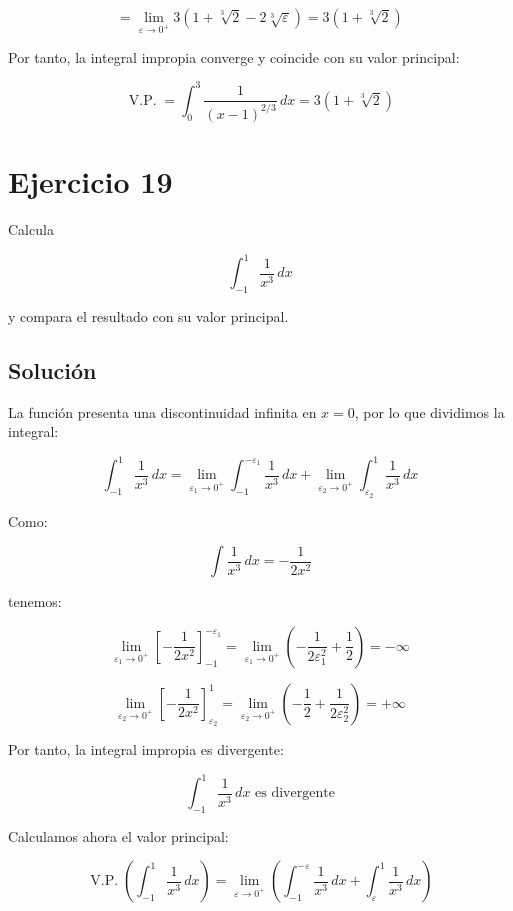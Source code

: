 \documentclass[fleqn]{article}
\begin{document}
	\[
	=
	\lim_{\varepsilon\to0^+}
	3\left(
	1+\sqrt[3]{2}-2\sqrt[3]{\varepsilon}
	\right)
	=
	3\left(1+\sqrt[3]{2}\right)
	\]

	Por tanto, la integral impropia converge y coincide con su valor principal:

	\[
	\boxed{
	\operatorname{V.P.}
	=
	\int_0^3\frac{1}{(x-1)^{2/3}}\,dx
	=
	3\left(1+\sqrt[3]{2}\right)
	}
	\]

\section{Ejercicio 19}
	Calcula

	\[
	\int_{-1}^{1}\frac{1}{x^3}\,dx
	\]

	y compara el resultado con su valor principal.

	\subsection{Solución}

	La función presenta una discontinuidad infinita en $x=0$, por lo que dividimos la integral:

	\[
	\int_{-1}^{1}\frac{1}{x^3}\,dx
	=
	\lim_{\varepsilon_1\to0^+}
	\int_{-1}^{-\varepsilon_1}\frac{1}{x^3}\,dx
	+
	\lim_{\varepsilon_2\to0^+}
	\int_{\varepsilon_2}^{1}\frac{1}{x^3}\,dx
	\]

	Como:

	\[
	\int\frac{1}{x^3}\,dx
	=
	-\frac{1}{2x^2}
	\]

	tenemos:

	\[
	\lim_{\varepsilon_1\to0^+}
	\left[
	-\frac{1}{2x^2}
	\right]_{-1}^{-\varepsilon_1}
	=
	\lim_{\varepsilon_1\to0^+}
	\left(
	-\frac{1}{2\varepsilon_1^2}
	+\frac{1}{2}
	\right)
	=
	-\infty
	\]

	\[
	\lim_{\varepsilon_2\to0^+}
	\left[
	-\frac{1}{2x^2}
	\right]_{\varepsilon_2}^{1}
	=
	\lim_{\varepsilon_2\to0^+}
	\left(
	-\frac{1}{2}
	+\frac{1}{2\varepsilon_2^2}
	\right)
	=
	+\infty
	\]

	Por tanto, la integral impropia es divergente:

	\[
	\boxed{
	\int_{-1}^{1}\frac{1}{x^3}\,dx
	\text{ es divergente}
	}
	\]

	Calculamos ahora el valor principal:

	\[
	\operatorname{V.P.}
	\left(
	\int_{-1}^{1}\frac{1}{x^3}\,dx
	\right)
	=
	\lim_{\varepsilon\to0^+}
	\left(
	\int_{-1}^{-\varepsilon}\frac{1}{x^3}\,dx
	+
	\int_{\varepsilon}^{1}\frac{1}{x^3}\,dx
	\right)
	\]
\end{document}
